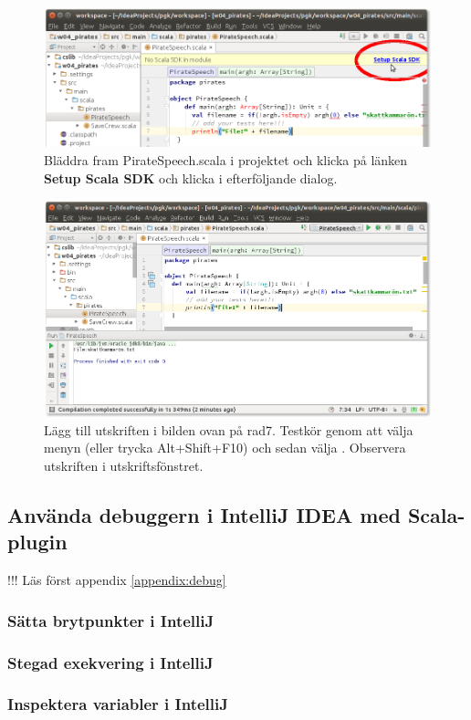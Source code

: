 \begin{figure}
\centering
\includegraphics[width=1.0\textwidth]{../img/intellij/idea-import7-setup-scala-sdk.png}

\caption{Bläddra fram PirateSpeech.scala i projektet  och klicka på länken \textbf{Setup Scala SDK} och klicka  i efterföljande dialog.}
\label{fig:idea:import78-setup-scala-sdk}
\end{figure}

\begin{figure}
\centering
\includegraphics[width=1.0\textwidth]{../img/intellij/idea-import9-run.png}
\caption{Lägg till utskriften i bilden ovan på rad7. Testkör genom att välja menyn  (eller trycka Alt+Shift+F10) och sedan välja . Observera utskriften i utskriftsfönstret.}
\label{fig:idea:import9-run}
\end{figure}

\clearpage

\subsection{Använda debuggern i IntelliJ IDEA med Scala-plugin}

!!! Läs först appendix \ref{appendix:debug}

\subsubsection{Sätta brytpunkter i IntelliJ}\TODO
\subsubsection{Stegad exekvering i IntelliJ}\TODO
\subsubsection{Inspektera variabler i IntelliJ}\TODO
